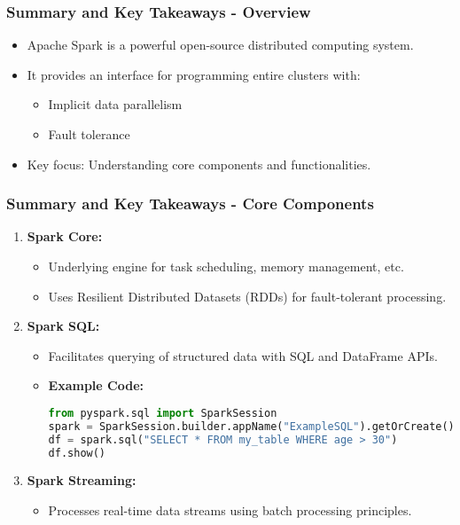 \documentclass[aspectratio=169]{beamer}
\begin{document}
\begin{frame}[fragile]
    \frametitle{Summary and Key Takeaways - Overview}
    \begin{itemize}
        \item Apache Spark is a powerful open-source distributed computing system.
        \item It provides an interface for programming entire clusters with:
        \begin{itemize}
            \item Implicit data parallelism
            \item Fault tolerance
        \end{itemize}
        \item Key focus: Understanding core components and functionalities.
    \end{itemize}
\end{frame}

\begin{frame}[fragile]
    \frametitle{Summary and Key Takeaways - Core Components}
    \begin{enumerate}
        \item \textbf{Spark Core:}
            \begin{itemize}
                \item Underlying engine for task scheduling, memory management, etc.
                \item Uses Resilient Distributed Datasets (RDDs) for fault-tolerant processing.
            \end{itemize}
        \item \textbf{Spark SQL:}
            \begin{itemize}
                \item Facilitates querying of structured data with SQL and DataFrame APIs.
                \item \textbf{Example Code:}
                \begin{lstlisting}[language=Python]
from pyspark.sql import SparkSession
spark = SparkSession.builder.appName("ExampleSQL").getOrCreate()
df = spark.sql("SELECT * FROM my_table WHERE age > 30")
df.show()
                \end{lstlisting}
            \end{itemize}
        \item \textbf{Spark Streaming:}
            \begin{itemize}
                \item Processes real-time data streams using batch processing principles.
            \end{itemize}
    \end{enumerate}
\end{frame}
\end{document}
